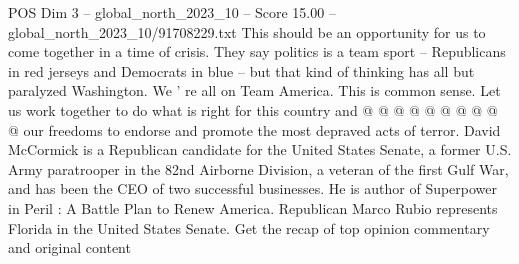 \begin{textsample}{POS Dim 3 – global\_north\_2023\_10 – Score 15.00 – global\_north\_2023\_10/91708229.txt}
This should be an opportunity for us to come together in a time of crisis.
They say politics is a team sport -- Republicans in red jerseys and Democrats in blue -- but that kind of thinking has all but paralyzed Washington.
We ' re all on Team America.
This is common sense.
Let us work together to do what is right for this country and @ @ @ @ @ @ @ @ @ @ our freedoms to endorse and promote the most depraved acts of terror.
David McCormick is a Republican candidate for the United States Senate, a former U.S.
Army paratrooper in the 82nd Airborne Division, a veteran of the first Gulf War, and has been the CEO of two successful businesses.
He is author of Superpower in Peril : A Battle Plan to Renew America.
Republican Marco Rubio represents Florida in the United States Senate.
Get the recap of top opinion commentary and original content

\end{textsample}
